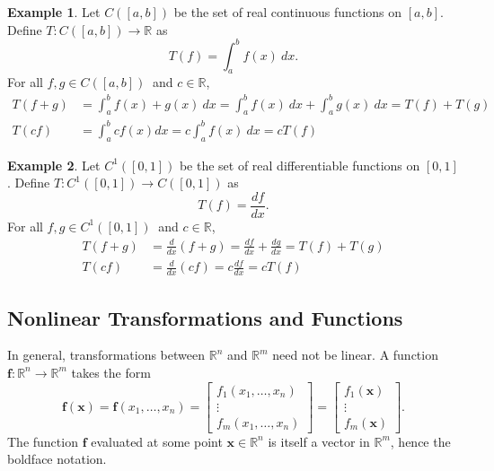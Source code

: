 \documentclass{article}
\newcommand{\R}{\mathbb{R}}
\newcommand{\x}{\mathbf{x}}
\newcommand{\f}{\mathbf{f}}
\theoremstyle{definition}
\newtheorem{example}{Example}[section]
\begin{document}
\begin{example}
	Let $ C([a,b]) $ be the set of real continuous functions on $ [a,b] $. Define $ T:C([a,b])\to \R $ as $$T(f)=\int_{a}^{b}f(x)\ dx .$$
	For all $ f,g\in C([a,b])\  $ and $ c\in\R $, 
	\begin{align*}
		T(f+g)&= \int_{a}^{b}f(x) +g(x)\ dx = \int_{a}^{b}f(x)\ dx + \int_{a}^{b}g(x)\ dx = T(f) + T(g) \\
		T(cf)&= \int_{a}^{b}cf(x)dx = c\int_{a}^{b}f(x)\ dx = cT(f)
	\end{align*}
\end{example}
\begin{example}
	Let $ C^1([0,1]) $ be the set of real differentiable functions on $ [0,1] $. Define $ T:C^1([0,1])\to C([0,1])  $  as $$ T(f)=\frac{df}{dx}. $$
	For all $ f,g\in C^1([0,1])\  $ and $ c\in\R $, 
	\begin{align*}
		T(f+g)&=\frac{d}{dx}(f+g) = \frac{df}{dx} + \frac{dg}{dx} = T(f) + T(g)\\
		T(cf) & = \frac{d}{dx}(cf)= c\frac{df}{dx} = cT(f)
	\end{align*}
\end{example}
\subsection{Nonlinear Transformations and Functions}
In general, transformations between $ \R^n $ and $ \R^m $ need not be linear. A function $ \f:\R^n\to\R^m $ takes the form 
$$\f(\x)=\f(x_1,\ldots,x_n) = \begin{bmatrix}
	f_1(x_1,\ldots,x_n)\\\vdots\\f_m(x_1,\ldots,x_n)
\end{bmatrix} = \begin{bmatrix}
f_1(\x)\\\vdots\\f_m(\x)
\end{bmatrix}.$$ The function $ \f $ evaluated at some point $ \x\in\R^n $ is itself a vector in $ \R^m $, hence the boldface notation. 
\end{document}
